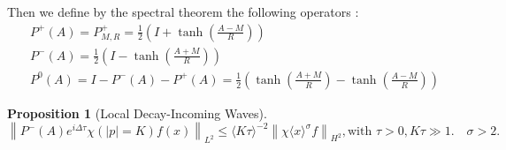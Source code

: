\documentclass[11pt]{article}
\newtheorem{proposition}[theorem]{Proposition}
\begin{document}
Then we define by the spectral theorem the following operators \cite{soffer2011monotonic}:
$$
\begin{aligned}
& P^{+}(A)=P_{M, R}^{+}=\frac{1}{2}\left(I+\tanh \left(\frac{A-M}{R}\right)\right) \\
& P^{-}(A)=\frac{1}{2}\left(I-\tanh \left(\frac{A+M}{R}\right)\right) \\
& P^{0}(A)=I-P^{-}(A)-P^{+}(A)=\frac{1}{2}\left(\tanh \left(\frac{A+M}{R}\right)-\tanh \left(\frac{A-M}{R}\right)\right)
\end{aligned}
$$

\begin{proposition} [Local Decay-Incoming Waves]

\begin{equation}\label{LD2}
\left\|P^{-}(A) e^{i \Delta \tau} \chi(|p|=K) f(x)\right\|_{L^{2}} \leq\langle K \tau\rangle^{-2}\left\|\chi\langle x\rangle^{\sigma} f\right\|_{H^{2}}, \text{with} \,\, \tau>0,  K \tau \gg 1 .\quad  \sigma>2.
\end{equation}
\end{proposition}
\end{document}
